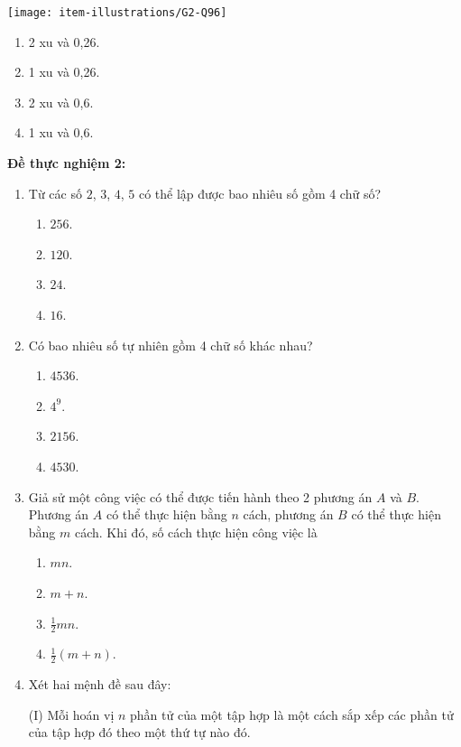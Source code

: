 \begin{enumerate}[label=\textbf{Câu \arabic*.},align=left,left=0cm..0cm,itemindent=*]
	{\centering\texttt{[image: item-illustrations/G2-Q96]}\par}
	\begin{enumerate}[label=\textbf{\Alph*.},align=left,left=1cm..0cm,itemindent=*]
		\item 2 xu và 0,26. \item 1 xu và 0,26. \item 2 xu và 0,6. \item 1 xu và 0,6.
	\end{enumerate}
\end{enumerate}

\noindent\textbf{Đề thực nghiệm 2:}
\begin{enumerate}[label=\textbf{Câu \arabic*.},align=left,left=0cm..0cm,itemindent=*]
	\item Từ các số $2$, $3$, $4$, $5$ có thể lập được bao nhiêu số gồm 4 chữ số?
	\begin{enumerate}[label=\textbf{\Alph*.},align=left,left=1cm..0cm,itemindent=*]
		\item $256$. \item $120$. \item $24$. \item $16$.
	\end{enumerate}
	\item Có bao nhiêu số tự nhiên gồm 4 chữ số khác nhau?
	\begin{enumerate}[label=\textbf{\Alph*.},align=left,left=1cm..0cm,itemindent=*]
		\item $4536$. \item $4^9$. \item $2156$. \item $4530$.
	\end{enumerate}
	\item Giả sử một công việc có thể được tiến hành theo 2 phương án $A$ và $B$. Phương án $A$ có thể thực hiện bằng $n$ cách, phương án $B$ có thể thực hiện bằng $m$ cách. Khi đó, số cách thực hiện công việc là
	\begin{enumerate}[label=\textbf{\Alph*.},align=left,left=1cm..0cm,itemindent=*]
		\item $mn$.
		\item $m+n$.
		\item $\frac 12mn$.
		\item $\frac 12(m+n)$.
	\end{enumerate}
	\item Xét hai mệnh đề sau đây:\par
	(I) Mỗi hoán vị $n$ phần tử của một tập hợp là một cách sắp xếp các phần tử của tập hợp đó theo một thứ tự nào đó.\par

\end{enumerate}
